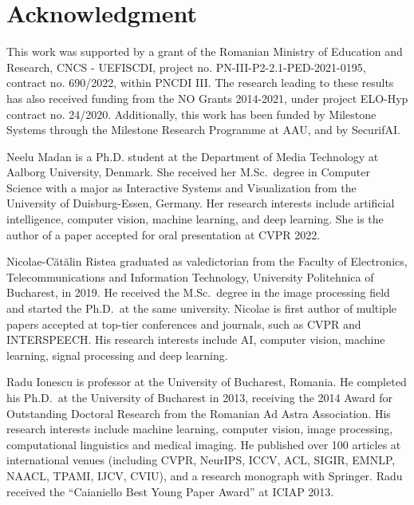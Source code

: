\documentclass[10pt,journal,compsoc]{IEEEtran}
\begin{document}
\section*{Acknowledgment}
\fi

This work was supported by a grant of the Romanian Ministry of Education and Research, CNCS - UEFISCDI, project no. PN-III-P2-2.1-PED-2021-0195, contract no. 690/2022, within PNCDI III. The research leading to these results has also received funding from the NO Grants 2014-2021, under project ELO-Hyp contract no. 24/2020. Additionally, this work has been funded by Milestone Systems through the Milestone Research Programme at AAU, and by SecurifAI. 

{\small


}

\begin{IEEEbiography}
{Neelu Madan} is a Ph.D. student at the Department of Media Technology at Aalborg University, Denmark. She received her M.Sc.~degree in Computer Science with a major as Interactive Systems and Visualization from the University of Duisburg-Essen, Germany. Her research interests include artificial intelligence, computer vision, machine learning, and deep learning. She is the author of a paper accepted for oral presentation at CVPR 2022.
\end{IEEEbiography}

\begin{IEEEbiography}
{Nicolae-C\u{a}t\u{a}lin Ristea} graduated as valedictorian from the Faculty of Electronics, Telecommunications and Information Technology, University Politehnica of Bucharest, in 2019. He received the M.Sc.~degree in the image processing field and started the Ph.D.~at the same university. Nicolae is first author of multiple papers accepted at top-tier conferences and journals, such as CVPR and INTERSPEECH. His research interests include AI, computer vision, machine learning, signal processing and deep learning.
\end{IEEEbiography}

\begin{IEEEbiography}
{Radu Ionescu} is professor at the University of Bucharest, Romania. He completed his Ph.D.~at the University of Bucharest in 2013, receiving the 2014 Award for Outstanding Doctoral Research from the Romanian Ad Astra Association.
His research interests include machine learning, computer vision, image processing, computational linguistics and medical imaging. He published over 100 articles at international venues (including CVPR, NeurIPS, ICCV, ACL, SIGIR, EMNLP, NAACL, TPAMI, IJCV, CVIU), and a research monograph with Springer. Radu received the ``Caianiello Best Young Paper Award'' at ICIAP 2013. \end{IEEEbiography}
\end{document}
